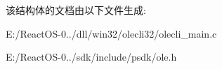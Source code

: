 该结构体的文档由以下文件生成\+:\begin{DoxyCompactItemize}
\item 
E\+:/\+React\+O\+S-\/0../dll/win32/olecli32/olecli\+\_\+main.\+c\item 
E\+:/\+React\+O\+S-\/0../sdk/include/psdk/ole.\+h\end{DoxyCompactItemize}
